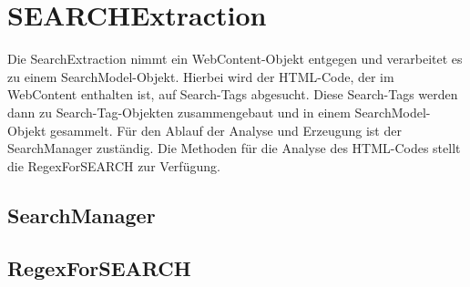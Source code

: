 
\section{SEARCHExtraction}
Die SearchExtraction nimmt ein WebContent-Objekt entgegen und verarbeitet es zu einem SearchModel-Objekt. Hierbei wird der HTML-Code, der im WebContent enthalten ist, auf Search-Tags abgesucht. Diese Search-Tags werden dann zu Search-Tag-Objekten zusammengebaut und in einem SearchModel-Objekt gesammelt.\newline
Für den Ablauf der Analyse und Erzeugung ist der SearchManager zuständig. Die Methoden für die Analyse des HTML-Codes stellt die RegexForSEARCH zur Verfügung.
\subsection{SearchManager}
\subsection{RegexForSEARCH}

